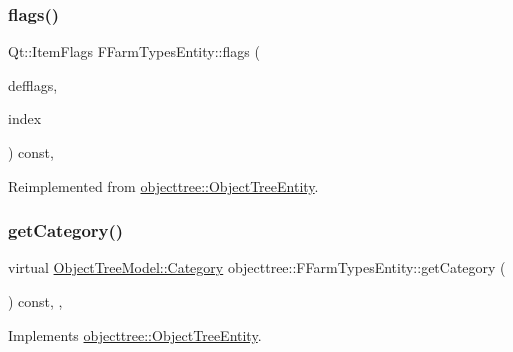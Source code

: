 \mbox{\label{classobjecttree_1_1_f_farm_types_entity_a90cf36929e178b9853e30e88fd9af9cb}} 
\subsubsection{\texorpdfstring{flags()}{flags()}}
{\footnotesize\ttfamily Qt\+::\+Item\+Flags F\+Farm\+Types\+Entity\+::flags (\begin{DoxyParamCaption}\item[{Qt\+::\+Item\+Flags}]{defflags,  }\item[{const Q\+Model\+Index \&}]{index }\end{DoxyParamCaption}) const\hspace{0.3cm}{\ttfamily [override]}, {\ttfamily [virtual]}}



Reimplemented from \mbox{\hyperlink{classobjecttree_1_1_object_tree_entity_a71042bfb5a8328bcbde9d283c0b1b28c}{objecttree\+::\+Object\+Tree\+Entity}}.

\mbox{\label{classobjecttree_1_1_f_farm_types_entity_a6b0ab1edb044f4feac77187629bbad6a}} 
\subsubsection{\texorpdfstring{getCategory()}{getCategory()}}
{\footnotesize\ttfamily virtual \mbox{\hyperlink{class_object_tree_model_a379e9d6b0d381853785adf62095ba4e3}{Object\+Tree\+Model\+::\+Category}} objecttree\+::\+F\+Farm\+Types\+Entity\+::get\+Category (\begin{DoxyParamCaption}{ }\end{DoxyParamCaption}) const\hspace{0.3cm}{\ttfamily [inline]}, {\ttfamily [override]}, {\ttfamily [virtual]}}



Implements \mbox{\hyperlink{classobjecttree_1_1_object_tree_entity_aa4e80e7fa80672c1b9902add665abc77}{objecttree\+::\+Object\+Tree\+Entity}}.


